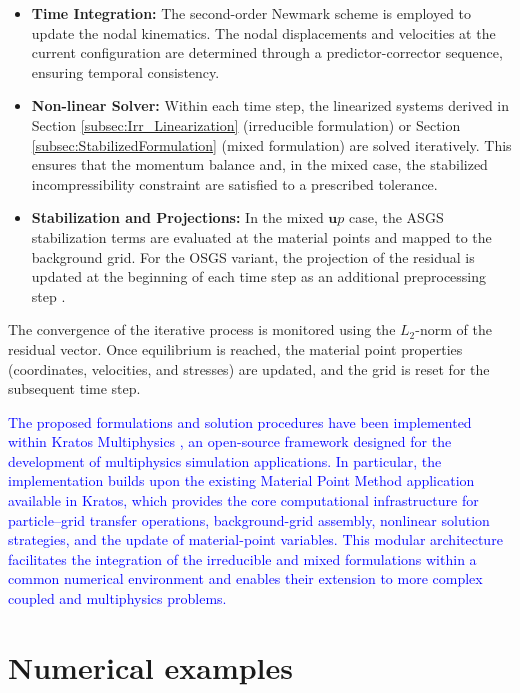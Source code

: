 \documentclass[11pt,english]{article}
\newcommand{\LM}[1]{\textcolor{blue}{#1}}
\def\up{$\boldsymbol{u}p$\xspace}
\begin{document}
    \begin{itemize}
        \item \textbf{Time Integration:} The second-order Newmark scheme is employed to update the nodal kinematics. The nodal displacements and velocities at the current configuration are determined through a predictor-corrector sequence, ensuring temporal consistency.
        \item \textbf{Non-linear Solver:} Within each time step, the linearized systems derived in Section \ref{subsec:Irr_Linearization} (irreducible formulation) or Section  \ref{subsec:StabilizedFormulation} (mixed formulation) are solved iteratively. This ensures that the momentum balance and, in the mixed case, the stabilized incompressibility constraint are satisfied to a prescribed tolerance.
        \item \textbf{Stabilization and Projections:} In the mixed \up case, the ASGS stabilization terms are evaluated at the material points and mapped to the background grid. For the OSGS variant, the projection of the residual is updated at the beginning of each time step as an additional preprocessing step \cite{castanar2020stabilized}.
    \end{itemize}
    
    The convergence of the iterative process is monitored using the $L_2$-norm of the residual vector. Once equilibrium is reached, the material point properties (coordinates, velocities, and stresses) are updated, and the grid is reset for the subsequent time step.

    \LM{The proposed formulations and solution procedures have been implemented within Kratos Multiphysics \cite{kratos1,kratos2,kratos3,KratosGithub}, an open-source framework designed for the development of multiphysics simulation applications. In particular, the implementation builds upon the existing Material Point Method application available in Kratos, which provides the core computational infrastructure for particle–grid transfer operations, background-grid assembly, nonlinear solution strategies, and the update of material-point variables. This modular architecture facilitates the integration of the irreducible and mixed formulations within a common numerical environment and enables their extension to more complex coupled and multiphysics problems.}

%
%
\section{Numerical examples} \label{sec:NumericalExamples}
\end{document}
